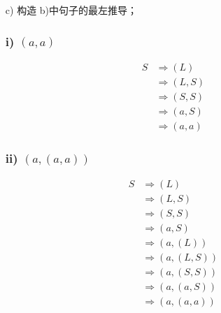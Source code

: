 \documentclass[a4paper, body={18cm,22cm}]{article}
\begin{document}
\begin{enumerate}
\begin{center}
    \end{center}
    

    \item[c)] 构造 b)中句子的最左推导； 
    
    \subsubsection*{i) $(a, a)$}
\begin{align*}
S &\Rightarrow (L) \\
&\Rightarrow (L,S) \\
&\Rightarrow (S,S) \\
&\Rightarrow (a,S) \\
&\Rightarrow (a,a)
\end{align*}

\subsubsection*{ii) $(a, (a, a))$}
\begin{align*}
S &\Rightarrow (L) \\
&\Rightarrow (L,S) \\
&\Rightarrow (S,S) \\
&\Rightarrow (a,S) \\
&\Rightarrow (a,(L)) \\
&\Rightarrow (a,(L,S)) \\
&\Rightarrow (a,(S,S)) \\
&\Rightarrow (a,(a,S)) \\
&\Rightarrow (a,(a,a))
\end{align*}


\end{enumerate}
\end{document}

